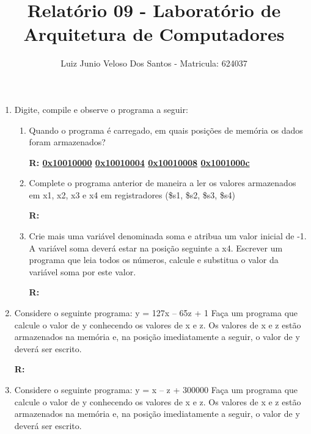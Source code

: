 \documentclass[a4paper,11pt]{article}
\title{\vspace{-4cm}Relatório 09 - Laboratório de Arquitetura de Computadores}
\author{Luiz Junio Veloso Dos Santos - Matricula: 624037}
\begin{document}
 

\maketitle

\begin{enumerate}
    \item{Digite, compile e observe o programa a seguir:}
        
        \begin{enumerate}
            \item{Quando o programa é carregado, em quais posições de memória 
                    os dados foram armazenados?}

                \textbf{R: \underline{0x10010000} \underline{0x10010004} \underline{0x10010008}
                    \underline{0x1001000c}}

            \item{Complete o programa anterior de maneira a ler os valores armazenados em x1, x2, x3 e x4
                    em registradores (\$s1, \$s2, \$s3, \$s4)}

                \textbf{R: }
                
                \newpage
            \item{Crie mais uma variável denominada soma e atribua um valor inicial de -1. A variável soma
                    deverá estar na posição seguinte a x4. Escrever um programa que leia todos os números, 
                    calcule e substitua o valor da variável soma por este valor.}

                \textbf{R: }
                
        \end{enumerate}
        \newpage
    \item{Considere o seguinte programa: y = 127x – 65z + 1 \newline 
            Faça um programa que calcule o valor de y conhecendo os valores de x e z. 
            Os valores de x e z estão armazenados na memória e, na posição imediatamente a seguir, 
            o valor de y deverá ser escrito.}

        \textbf{R: }
        
        \newpage
    \item{Considere o seguinte programa: y = x – z + 300000 \newline 
            Faça um programa que calcule o valor de y conhecendo os valores de x e z. 
            Os valores de x e z estão armazenados na memória e, na posição imediatamente a seguir, 
            o valor de y deverá ser escrito.}


\end{enumerate}
\end{document}
